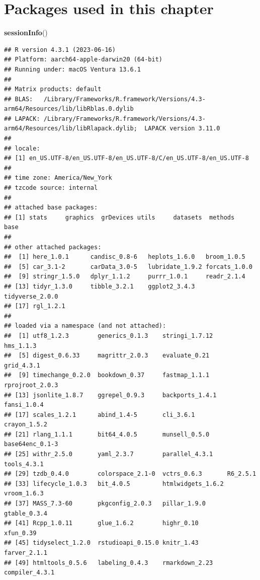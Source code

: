 \documentclass[
]{book}
\newenvironment{Shaded}{\begin{snugshade}}{\end{snugshade}}
\newcommand{\FunctionTok}[1]{\textcolor[rgb]{0.13,0.29,0.53}{\textbf{#1}}}
\newcommand{\NormalTok}[1]{#1}
\begin{document}
\section{Packages used in this chapter}\label{packages-used-in-this-chapter-4}

\begin{Shaded}
\begin{Highlighting}[]
\FunctionTok{sessionInfo}\NormalTok{()}
\end{Highlighting}
\end{Shaded}

\begin{verbatim}
## R version 4.3.1 (2023-06-16)
## Platform: aarch64-apple-darwin20 (64-bit)
## Running under: macOS Ventura 13.6.1
## 
## Matrix products: default
## BLAS:   /Library/Frameworks/R.framework/Versions/4.3-arm64/Resources/lib/libRblas.0.dylib 
## LAPACK: /Library/Frameworks/R.framework/Versions/4.3-arm64/Resources/lib/libRlapack.dylib;  LAPACK version 3.11.0
## 
## locale:
## [1] en_US.UTF-8/en_US.UTF-8/en_US.UTF-8/C/en_US.UTF-8/en_US.UTF-8
## 
## time zone: America/New_York
## tzcode source: internal
## 
## attached base packages:
## [1] stats     graphics  grDevices utils     datasets  methods   base     
## 
## other attached packages:
##  [1] here_1.0.1      candisc_0.8-6   heplots_1.6.0   broom_1.0.5    
##  [5] car_3.1-2       carData_3.0-5   lubridate_1.9.2 forcats_1.0.0  
##  [9] stringr_1.5.0   dplyr_1.1.2     purrr_1.0.1     readr_2.1.4    
## [13] tidyr_1.3.0     tibble_3.2.1    ggplot2_3.4.3   tidyverse_2.0.0
## [17] rgl_1.2.1      
## 
## loaded via a namespace (and not attached):
##  [1] utf8_1.2.3        generics_0.1.3    stringi_1.7.12    hms_1.1.3        
##  [5] digest_0.6.33     magrittr_2.0.3    evaluate_0.21     grid_4.3.1       
##  [9] timechange_0.2.0  bookdown_0.37     fastmap_1.1.1     rprojroot_2.0.3  
## [13] jsonlite_1.8.7    ggrepel_0.9.3     backports_1.4.1   fansi_1.0.4      
## [17] scales_1.2.1      abind_1.4-5       cli_3.6.1         crayon_1.5.2     
## [21] rlang_1.1.1       bit64_4.0.5       munsell_0.5.0     base64enc_0.1-3  
## [25] withr_2.5.0       yaml_2.3.7        parallel_4.3.1    tools_4.3.1      
## [29] tzdb_0.4.0        colorspace_2.1-0  vctrs_0.6.3       R6_2.5.1         
## [33] lifecycle_1.0.3   bit_4.0.5         htmlwidgets_1.6.2 vroom_1.6.3      
## [37] MASS_7.3-60       pkgconfig_2.0.3   pillar_1.9.0      gtable_0.3.4     
## [41] Rcpp_1.0.11       glue_1.6.2        highr_0.10        xfun_0.39        
## [45] tidyselect_1.2.0  rstudioapi_0.15.0 knitr_1.43        farver_2.1.1     
## [49] htmltools_0.5.6   labeling_0.4.3    rmarkdown_2.23    compiler_4.3.1
\end{verbatim}
\end{document}
